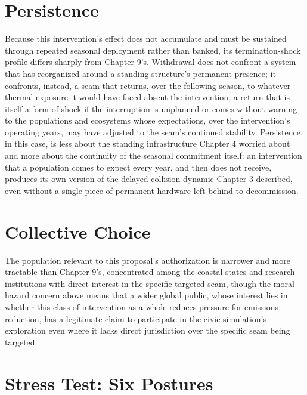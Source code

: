 \documentclass[11pt,oneside]{book}
\begin{document}
\section*{Persistence}

Because this intervention's effect does not accumulate and must be sustained through repeated seasonal deployment rather than banked, its termination-shock profile differs sharply from Chapter 9's. Withdrawal does not confront a system that has reorganized around a standing structure's permanent presence; it confronts, instead, a seam that returns, over the following season, to whatever thermal exposure it would have faced absent the intervention, a return that is itself a form of shock if the interruption is unplanned or comes without warning to the populations and ecosystems whose expectations, over the intervention's operating years, may have adjusted to the seam's continued stability. Persistence, in this case, is less about the standing infrastructure Chapter 4 worried about and more about the continuity of the seasonal commitment itself: an intervention that a population comes to expect every year, and then does not receive, produces its own version of the delayed-collision dynamic Chapter 3 described, even without a single piece of permanent hardware left behind to decommission.

\section*{Collective Choice}

The population relevant to this proposal's authorization is narrower and more tractable than Chapter 9's, concentrated among the coastal states and research institutions with direct interest in the specific targeted seam, though the moral-hazard concern above means that a wider global public, whose interest lies in whether this class of intervention as a whole reduces pressure for emissions reduction, has a legitimate claim to participate in the civic simulation's exploration even where it lacks direct jurisdiction over the specific seam being targeted.

\section*{Stress Test: Six Postures}
\end{document}

